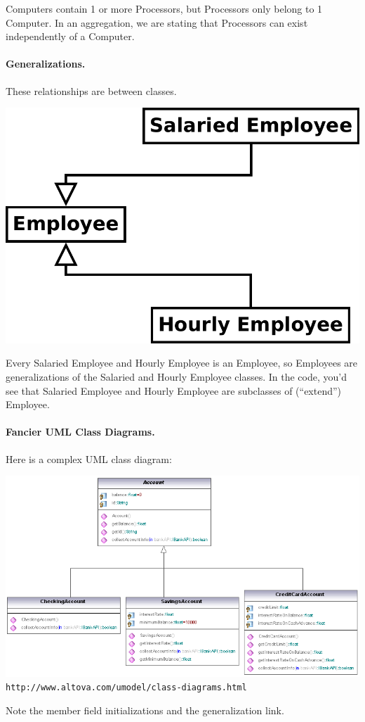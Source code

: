 Computers contain 1 or more Processors, but Processors only
belong to 1 Computer. In an aggregation, we are stating that 
Processors can exist independently of a Computer.

\paragraph{Generalizations.} These relationships are between
classes.
\begin{center}
\includegraphics[width=.3\textwidth]{images/generalization.pdf}
\end{center}
Every Salaried Employee and Hourly Employee is an Employee, 
so Employees are generalizations of the Salaried and Hourly
Employee classes. In the code, you'd see that Salaried Employee
and Hourly Employee are subclasses of (``extend'') Employee.

\paragraph{Fancier UML Class Diagrams.} Here is a complex
UML class diagram:

\begin{center}
\includegraphics[width=\textwidth]{images/UML_class_diagram_example.png}
{\small \texttt{http://www.altova.com/umodel/class-diagrams.html}}
\end{center}
Note the member field initializations and the generalization link.


